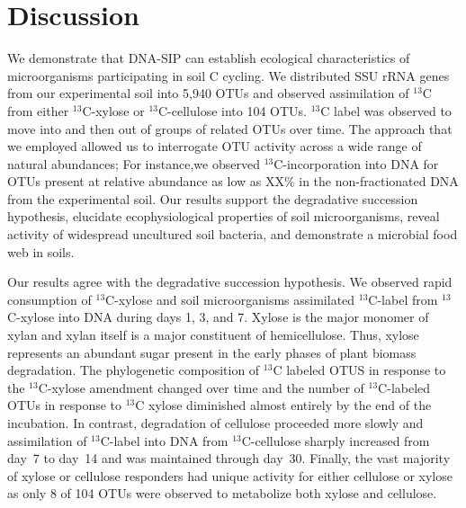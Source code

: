 \section{Discussion} 
We demonstrate that DNA-SIP can establish ecological characteristics of
microorganisms participating in soil C cycling. We distributed SSU rRNA genes
from our experimental soil into 5,940 OTUs and observed assimilation of
$^{13}$C from either $^{13}$C-xylose or $^{13}$C-cellulose into 104 OTUs.
$^{13}$C label was observed to move into and then out of groups of related OTUs
over time. The approach that we employed allowed us to interrogate OTU activity
across a wide range of natural abundances; For instance,we observed
$^{13}$C-incorporation into DNA for OTUs present at relative abundance as low
as XX\% in the non-fractionated DNA from the experimental soil. Our results
support the degradative succession hypothesis, elucidate ecophysiological
properties of soil microorganisms, reveal activity of widespread uncultured
soil bacteria, and demonstrate a microbial food web in soils. 

Our results agree with the degradative succession hypothesis. We observed rapid
consumption of $^{13}$C-xylose and soil microorganisms assimilated
$^{13}$C-label from $^{13}$C-xylose into DNA during days 1, 3, and 7. Xylose is
the major monomer of xylan and xylan itself is a major constituent of
hemicellulose. Thus, xylose represents an abundant sugar present in the early
phases of plant biomass degradation. The phylogenetic composition of $^{13}$C
labeled OTUS in response to the $^{13}$C-xylose amendment changed over time and
the number of $^{13}$C-labeled OTUs in response to $^{13}$C xylose
diminished almost entirely by the end of the incubation. In contrast,
degradation of cellulose proceeded more slowly and assimilation of
$^{13}$C-label into DNA from $^{13}$C-cellulose sharply increased from day~7 to
day~14 and was maintained through day~30. Finally, the vast majority
of xylose or cellulose responders had unique activity for either cellulose or
xylose as only 8 of 104 OTUs were observed to metabolize both xylose and
cellulose. 

